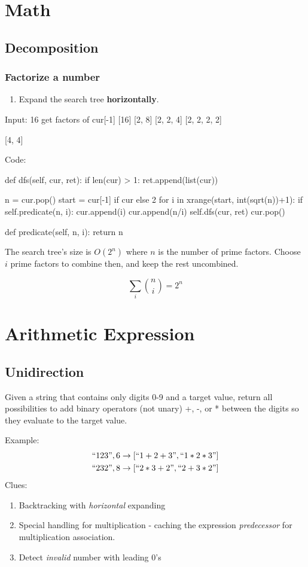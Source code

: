 \section{Math}
\subsection{Decomposition}
\subsubsection{Factorize a number}\label{factorization}
\begin{enumerate}
\item Expand the search tree \textbf{horizontally}.
\end{enumerate}
\begin{python}
Input: 16
get factors of cur[-1]
[16]
[2, 8]
[2, 2, 4]
[2, 2, 2, 2]

[4, 4]
\end{python}
Code:
\begin{python}
def dfs(self, cur, ret):
  if len(cur) > 1:
    ret.append(list(cur))

  n = cur.pop()
  start = cur[-1] if cur else 2
  for i in xrange(start, int(sqrt(n))+1):
    if self.predicate(n, i):
      cur.append(i)
      cur.append(n/i)
      self.dfs(cur, ret)
      cur.pop()
            
def predicate(self, n, i):
  return n%
  
\end{python}
 The search tree's size is $O(2^n)$ where $n$ is the number
of prime factors. Choose $i$ prime factors to combine then, and keep the rest uncombined.


$$\sum_i {n \choose i} = 2^n$$

\section{Arithmetic Expression}
\subsection{Unidirection}
 Given a string that contains only digits 0-9 and a target value,
return all possibilities to add binary operators (not unary) +, -, or * between the
digits so they evaluate to the target value.

Example: 
\begin{align*}
``123", 6 \rightarrow [``1+2+3", ``1*2*3"] \\ 
``232", 8 \rightarrow [``2*3+2", ``2+3*2"] \\
\end{align*}
Clues:
\begin{enumerate}
\item Backtracking with \textit{horizontal} expanding
\item Special handling for multiplication - caching the expression \textit{predecessor}
for multiplication association. 
\item Detect \textit{invalid} number with leading 0's
\end{enumerate}

